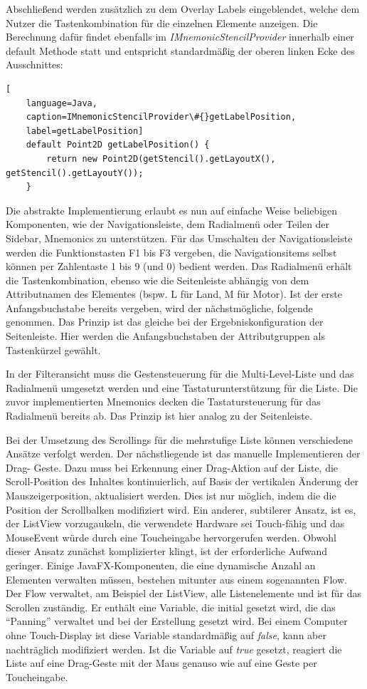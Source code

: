 Abschließend werden zusätzlich zu dem Overlay Labels eingeblendet, welche dem Nutzer die Tastenkombination für die einzelnen Elemente anzeigen. Die Berechnung dafür findet ebenfalls im \textit{IMnemonicStencilProvider} innerhalb einer default Methode statt und entspricht standardmäßig der oberen linken Ecke des Ausschnittes:\par
{}
\begin{lstlisting}[
    language=Java,
    caption=IMnemonicStencilProvider\#{}getLabelPosition,
    label=getLabelPosition]
    default Point2D getLabelPosition() {
        return new Point2D(getStencil().getLayoutX(), getStencil().getLayoutY());
    }
\end{lstlisting}
\par
Die abstrakte Implementierung erlaubt es nun auf einfache Weise beliebigen Komponenten, wie der Navigationsleiste, dem Radialmenü oder Teilen der Sidebar, Mnemonics zu unterstützen. Für das Umschalten der Navigationsleiste werden die Funktionstasten F1 bis F3 vergeben, die Navigationsitems selbst können per Zahlentaste 1 bis 9 (und 0) bedient werden. Das Radialmenü erhält die Tastenkombination, ebenso wie die Seitenleiste abhängig von dem Attributnamen des Elementes (bspw. L für Land, M für Motor). Ist der erste Anfangsbuchstabe bereits vergeben, wird der nächstmögliche, folgende genommen. Das Prinzip ist das gleiche bei der Ergebniskonfiguration der Seitenleiste. Hier werden die Anfangsbuchstaben der Attributgruppen als Tastenkürzel gewählt.\par
{}
In der Filteransicht muss die Gestensteuerung für die Multi-Level-Liste und das Radialmenü umgesetzt werden und eine Tastaturunterstützung für die Liste. Die zuvor implementierten Mnemonics decken die Tastatursteuerung für das Radialmenü bereits ab. Das Prinzip ist hier analog zu der Seitenleiste. \par
Bei der Umsetzung des Scrollings für die mehrstufige Liste können verschiedene Ansätze verfolgt werden. Der nächstliegende ist das manuelle Implementieren der Drag- Geste. Dazu muss bei Erkennung einer Drag-Aktion auf der Liste, die Scroll-Position des Inhaltes kontinuierlich, auf Basis der vertikalen Änderung der Mauszeigerposition, aktualisiert werden. Dies ist nur möglich, indem die die Position der Scrollbalken modifiziert wird. Ein anderer, subtilerer Ansatz, ist es, der ListView vorzugaukeln, die verwendete Hardware sei Touch-fähig und das MouseEvent würde durch eine Toucheingabe hervorgerufen werden. Obwohl dieser Ansatz zunächst komplizierter klingt, ist der erforderliche Aufwand geringer. Einige JavaFX-Komponenten, die eine dynamische Anzahl an Elementen verwalten müssen, bestehen mitunter aus einem sogenannten Flow. Der Flow verwaltet, am Beispiel der ListView, alle Listenelemente und ist für das Scrollen zuständig. Er enthält eine Variable, die initial gesetzt wird, die das \enquote{Panning} verwaltet und bei der Erstellung gesetzt wird. Bei einem Computer ohne Touch-Display ist diese Variable standardmäßig auf \textit{false}, kann aber nachträglich modifiziert werden. Ist die Variable auf \textit{true} gesetzt, reagiert die Liste auf eine Drag-Geste mit der Maus genauso wie auf eine Geste per Toucheingabe.\par
